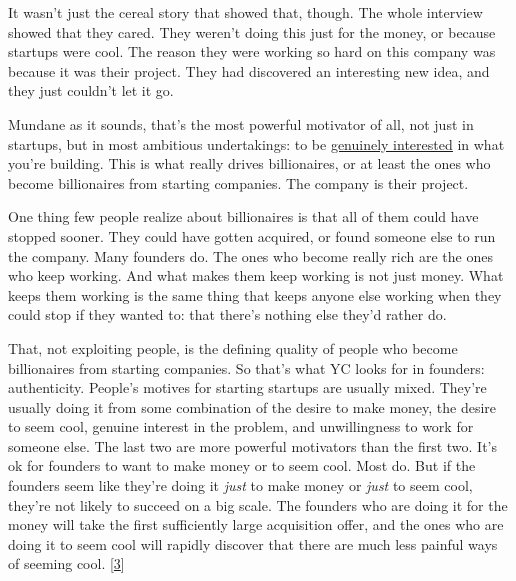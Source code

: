 It wasn't just
                  the cereal story that showed that, though. The whole interview
                  showed that they cared. They weren't doing this just for the
                  money, or because startups were cool. The reason they were
                  working so hard on this company was because it was their
                  project. They had discovered an interesting new idea, and they
                  just couldn't let it go.

Mundane as it sounds,
                  that's the most powerful motivator of all, not just in
                  startups, but in most ambitious undertakings: to be
                  \href{http://www.paulgraham.com/genius.html}{\underline{genuinely interested}} in what
                  you're building. This is what really drives billionaires, or
                  at least the ones who become billionaires from starting
                  companies. The company is their project.

One thing
                  few people realize about billionaires is that all of them
                  could have stopped sooner. They could have gotten acquired, or
                  found someone else to run the company. Many founders do. The
                  ones who become really rich are the ones who keep working. And
                  what makes them keep working is not just money. What keeps
                  them working is the same thing that keeps anyone else working
                  when they could stop if they wanted to: that there's nothing
                  else they'd rather do.

That, not exploiting people,
                  is the defining quality of people who become billionaires from
                  starting companies. So that's what YC looks for in founders:
                  authenticity. People's motives for starting startups are
                  usually mixed. They're usually doing it from some combination
                  of the desire to make money, the desire to seem cool, genuine
                  interest in the problem, and unwillingness to work for someone
                  else. The last two are more powerful motivators than the first
                  two. It's ok for founders to want to make money or to seem
                  cool. Most do. But if the founders seem like they're doing it
                  \emph{just} to make money or \emph{just} to seem cool, they're
                  not likely to succeed on a big scale. The founders who are
                  doing it for the money will take the first sufficiently large
                  acquisition offer, and the ones who are doing it to seem cool
                  will rapidly discover that there are much less painful ways of
                  seeming cool.
                  [\href{\#f3n}{3}]

